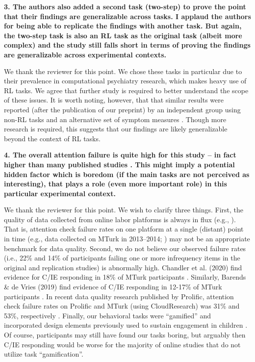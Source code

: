 \documentclass[a4paper,notitlepage,12pt]{article}
\begin{document}
\textbf{3. The authors also added a second task (two-step) to prove the point that their findings are generalizable across tasks. I applaud the authors for being able to replicate the findings with another task. But again, the two-step task is also an RL task as the original task (albeit more complex) and the study still falls short in terms of proving the findings are generalizable across experimental contexts.}

We thank the reviewer for this point. We chose these tasks in particular due to their prevalence in computational psychiatry research, which makes heavy use of RL tasks. We agree that further study is required to better understand the scope of these issues. It is worth noting, however, that that similar results were reported (after the publication of our preprint) by an independent group using non-RL tasks and an alternative set of symptom measures \cite{sulik2021delusion}. Though more research is required, this suggests that our findings are likely generalizable beyond the context of RL tasks. 

\textbf{4. The overall attention failure is quite high for this study – in fact higher than many published studies \cite{hauser2016attentive}. This might imply a potential hidden factor which is boredom (if the main tasks are not perceived as interesting), that plays a role (even more important role) in this particular experimental context.}

We thank the reviewer for this point. We wish to clarify three things. First, the quality of data collected from online labor platforms is always in flux (e.g., \cite{Moss2018-vy, Charalambides2021-fd}). That is, attention check failure rates on one platform at a single (distant) point in time (e.g., data collected on MTurk in 2013--2014; \cite{hauser2016attentive}) may not be an appropriate benchmark for data quality. Second, we do not believe our observed failure rates (i.e., 22\% and 14\% of participants failing one or more infrequency items in the original and replication studies) is abnormally high. Chandler et al. (2020) find evidence for C/IE responding in 18\% of MTurk participants \cite{Chandler2020-ja}. Similarly, Barends \& de Vries (2019) find evidence of C/IE responding in 12-17\% of MTurk participants \cite{Barends2019-ud}. In recent data quality research published by Prolific, attention check failure rates on Prolific and MTurk (using CloudResearch) was 31\% and 53\%, respectively \cite{eyal2021data}. Finally, our behavioral tasks were ``gamified'' and incorporated design elements previously used to sustain engagement in children \cite{decker2016creatures, nussenbaum2020moving}. Of course, participants may still have found our tasks boring, but arguably then C/IE responding would be worse for the majority of online studies that do not utilize task ``gamification''. 
\end{document}
